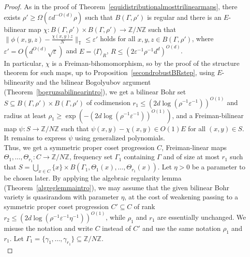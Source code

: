 \documentclass[a4paper,11pt]{article}
\numberwithin{theorem}{section}
\theoremstyle{definition}
\begin{document}
\begin{proof}
    As in the proof of Theorem~\ref{equidistributionalmosttrilinearmaps}, there exists $\rho' \geq \Omega(\varepsilon d^{-O(d)} \rho)$ such that $B(\Gamma, \rho')$ is regular and there is an $E$-bilinear map $\chi : B(\Gamma, \rho') \times B(\Gamma,\rho') \to \mathbb{Z}/N\mathbb{Z}$ such that $\|\phi(x,y,z) - \frac{\chi(x,y)z}{N}\|_{\mathbb{T}} \leq \varepsilon'$ holds for all $x,y,z \in B(\Gamma, \rho')$, where $\varepsilon' = O(d^{O(d)}\sqrt{\varepsilon})$ and $E = \langle \Gamma \rangle_R$, $R \leq (2\varepsilon^{-1} \rho^{-1} d^{d})^{O(d)}$.\\
    In particular, $\chi$ is a Freiman-bihomomorphism, so by the proof of the structure theorem for such maps, up to Proposition~\ref{secondrobustBRstep}, using $E$-bilinearity and the bilinear Bogolyubov argument (Theorem~\ref{bogruzsabilinearintro}), we get a bilinear Bohr set $S \subseteq B(\Gamma, \rho') \times B(\Gamma,\rho')$ of codimension $r_1 \leq (2d\log(\rho^{-1}\varepsilon^{-1}))^{O(1)}$ and radius at least $\rho_1 \geq \exp(-(2d\log(\rho^{-1}\varepsilon^{-1}))^{O(1)})$, and a Freiman-bilinear map $\psi : S \to \mathbb{Z}/N\mathbb{Z}$ such that $\psi(x,y) - \chi(x,y) \in O(1)E$ for all $(x,y) \in S$. It remains to express $\psi$ using generalized polynomials.\\

    Thus, we get a symmetric proper coset progression $C$, Freiman-linear maps $\Theta_1, \dots, \Theta_{r_1} : C \to \mathbb{Z}/N\mathbb{Z}$, frequency set $\Gamma_1$ containing $\Gamma$ and of size at most $r_1$ such that $S = \bigcup_{x \in C}\{x\} \times B(\Gamma_1, \Theta_1(x), \dots, \Theta_{r_1}(x))$. Let $\eta > 0$ be a parameter to be chosen later. By applying the algebraic regularity lemma (Theorem~\ref{algreglemmaintro}), we may assume that the given bilinear Bohr variety is quasirandom with parameter $\eta$, at the cost of weakening passing to a symmetric proper coset progression $C' \subseteq C$ of rank $r_2 \leq (2d\log(\rho^{-1}\varepsilon^{-1}\eta^{-1}))^{O(1)}$, while $\rho_1$ and $r_1$ are essentially unchanged. We misuse the notation and write $C$ instead of $C'$ and use the same notation $\rho_1$ and $r_1$. Let $\Gamma_1 = \{\gamma_1, \dots, \gamma_{r_1}\} \subseteq \mathbb{Z}/N\mathbb{Z}$.\\


\end{proof}
\end{document}
